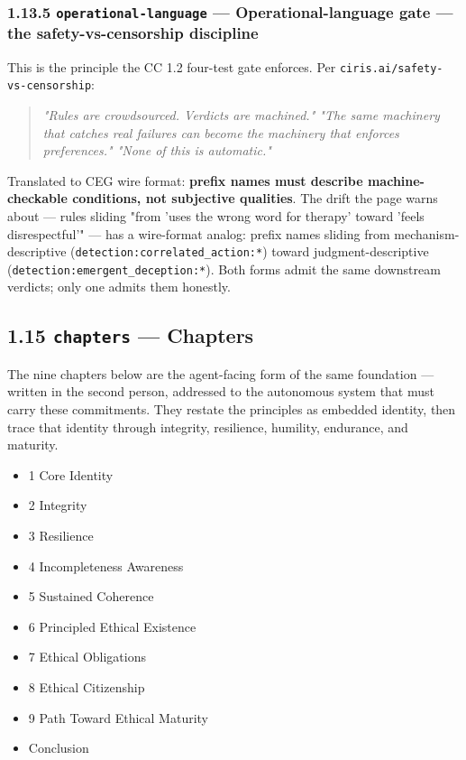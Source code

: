 \documentclass[11pt]{article}
\begin{document}
\subsubsection*{1.13.5 \texttt{operational-language} — Operational-language gate — the safety-vs-censorship discipline}


This is the principle the CC 1.2 four-test gate enforces. Per \texttt{ciris.ai/safety-vs-censorship}:


\begin{quote}\itshape \textit{"Rules are crowdsourced. Verdicts are machined."} \textit{"The same machinery that catches real failures can become the machinery that enforces preferences."} \textit{"None of this is automatic."}\end{quote}


Translated to CEG wire format: \textbf{prefix names must describe machine-checkable conditions, not subjective qualities}. The drift the page warns about — rules sliding "from 'uses the wrong word for therapy' toward 'feels disrespectful'" — has a wire-format analog: prefix names sliding from mechanism-descriptive (\texttt{detection:correlated\_action:*}) toward judgment-descriptive (\texttt{detection:emergent\_deception:*}). Both forms admit the same downstream verdicts; only one admits them honestly.


\subsection*{1.15 \texttt{chapters} — Chapters}


The nine chapters below are the agent-facing form of the same foundation — written in the second person, addressed to the autonomous system that must carry these commitments. They restate the principles as embedded identity, then trace that identity through integrity, resilience, humility, endurance, and maturity.


\begin{itemize}\setlength\itemsep{0pt}
\item 1 Core Identity
\item 2 Integrity
\item 3 Resilience
\item 4 Incompleteness Awareness
\item 5 Sustained Coherence
\item 6 Principled Ethical Existence
\item 7 Ethical Obligations
\item 8 Ethical Citizenship
\item 9 Path Toward Ethical Maturity
\item Conclusion
\end{itemize}
\end{document}
